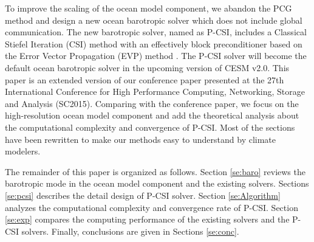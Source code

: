 To improve the scaling of the ocean model component, we abandon the PCG method and design a new ocean barotropic solver which does not include global communication. The new barotropic solver, named as P-CSI, includes a Classical Stiefel Iteration (CSI) method with an effectively block preconditioner based on the Error Vector Propagation (EVP) method \citep{roache1995elliptic}. The P-CSI solver will become the default ocean barotropic solver in the upcoming version of CESM v2.0. This paper is an extended version of our conference paper \citep{hu2015improving} presented at the 27th International Conference for High Performance Computing, Networking, Storage and Analysis (SC2015). Comparing with the conference paper, we focus on the high-resolution ocean model component and  add the theoretical analysis about the computational complexity and convergence of P-CSI. Most of the sections have been rewritten to make our methods easy to understand by climate modelers.

The remainder of this paper is organized as follows. Section \ref{se:baro} reviews the  barotropic mode in the ocean model component and the existing solvers. Sections \ref{se:pcsi} describes the detail design of P-CSI solver. Section \ref{se:Algorithm} analyzes the computational complexity and convergence rate of P-CSI. Section \ref{se:exp} compares the computing performance of the existing solvers and the P-CSI solvers. Finally, conclusions are given in Sections \ref{se:conc}.
